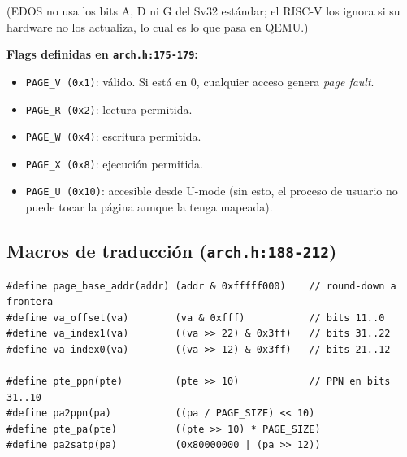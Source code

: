 \documentclass[11pt,a4paper]{article}
\begin{document}
\begin{center}
\end{center}

(EDOS no usa los bits A, D ni G del Sv32 estándar; el RISC-V los
ignora si su hardware no los actualiza, lo cual es lo que pasa en
QEMU.)

\textbf{Flags definidas en \texttt{arch.h:175-179}:}

\begin{itemize}[nosep,leftmargin=*]
    \item \texttt{PAGE\_V (0x1)}: válido. Si está en 0, cualquier
        acceso genera \emph{page fault}.
    \item \texttt{PAGE\_R (0x2)}: lectura permitida.
    \item \texttt{PAGE\_W (0x4)}: escritura permitida.
    \item \texttt{PAGE\_X (0x8)}: ejecución permitida.
    \item \texttt{PAGE\_U (0x10)}: accesible desde U-mode (sin esto,
        el proceso de usuario no puede tocar la página aunque la
        tenga mapeada).
\end{itemize}

\subsection*{Macros de traducción (\texttt{arch.h:188-212})}

\begin{lstlisting}[style=cstyle]
#define page_base_addr(addr) (addr & 0xfffff000)    // round-down a frontera
#define va_offset(va)        (va & 0xfff)           // bits 11..0
#define va_index1(va)        ((va >> 22) & 0x3ff)   // bits 31..22
#define va_index0(va)        ((va >> 12) & 0x3ff)   // bits 21..12

#define pte_ppn(pte)         (pte >> 10)            // PPN en bits 31..10
#define pa2ppn(pa)           ((pa / PAGE_SIZE) << 10)
#define pte_pa(pte)          ((pte >> 10) * PAGE_SIZE)
#define pa2satp(pa)          (0x80000000 | (pa >> 12))
\end{lstlisting}
\end{document}
